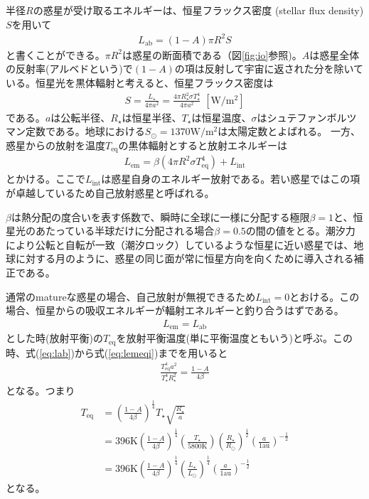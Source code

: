 半径$R$の惑星が受け取るエネルギーは、恒星フラックス密度  (stellar flux density) $S$を用いて
\begin{align}
\label{eq:lab}
L_{\mathrm{ab}}=(1-A) \pi R^2 S  
\end{align}
と書くことができる。$\pi R^2$は惑星の断面積である（図\ref{fig:io}参照)。$A$は惑星全体の反射率(アルベドという)で$(1-A)$の項は反射して宇宙に返された分を除いている。恒星光を黒体輻射と考えると、恒星フラックス密度は
\begin{align}
  \label{eq:starfluxdens}
S= \frac{L_\star}{4 \pi a^2} = \frac{4 \pi R_\star^2 \sigma T_\star^4}{4 \pi a^2}\,\,\mathrm{[W/m^2]} 
\end{align}
である。$a$は公転半径、$R_\star$は恒星半径、$T_\star$は恒星温度、$\sigma$はシュテファンボルツマン定数である。地球における$S_\odot =1370 \mathrm{W/m^2}$は太陽定数とよばれる。
一方、惑星からの放射を温度$T_{\mathrm{eq}}$の黒体輻射とすると放射エネルギーは
\begin{align}
\label{eq:lem}
L_{\mathrm{em}} = \beta ( 4 \pi R^2 \sigma T_{\mathrm{eq}}^4 ) + L_\mathrm{int}
\end{align}
とかける。ここで$ L_\mathrm{int}$は惑星自身のエネルギー放射である。若い惑星ではこの項が卓越しているため自己放射惑星と呼ばれる。

$\beta$は熱分配の度合いを表す係数で、瞬時に全球に一様に分配する極限$\beta=1$と、恒星光のあたっている半球だけに分配される場合$\beta=0.5$の間の値をとる。潮汐力により公転と自転が一致（潮汐ロック）しているような恒星に近い惑星では、地球に対する月のように、惑星の同じ面が常に恒星方向を向くために導入される補正である。


通常のmatureな惑星の場合、自己放射が無視できるため$L_\mathrm{int}=0$とおける。この場合、恒星からの吸収エネルギーが輻射エネルギーと釣り合うはずである。
\begin{align}
\label{eq:lemeqi}
  L_{\mathrm{em}} = L_{\mathrm{ab}}
\end{align}
とした時(放射平衡)の$T_{\mathrm{eq}}$を放射平衡温度(単に平衡温度ともいう)と呼ぶ。この時、式(\ref{eq:lab})から式(\ref{eq:lemeqi})までを用いると
\begin{align}
  \label{eq:eqteq}
 \frac{T_{\mathrm{eq}}^4 a^2 }{T_\star^4 R_\star^2} = \frac{1-A}{4 \beta}
\end{align}
となる。つまり
\begin{align}
 T_\mathrm{eq} &= \left(\frac{1-A}{4 \beta}\right)^{\frac{1}{4}} T_\star \sqrt{\frac{R_\star}{a}} \\
&= 396 \mathrm{K}  \left(\frac{1-A}{4 \beta}\right)^{\frac{1}{4}} \left( \frac{T_\star}{5800 \mathrm{K}}\right) \left( \frac{R_\star}{R_\odot}\right)^{\frac{1}{2}} \left( \frac{a}{1 \mathrm{au}}\right)^{-\frac{1}{2}} \\
&= 396 \mathrm{K}  \left(\frac{1-A}{4 \beta}\right)^{\frac{1}{4}} \left( \frac{L_\star}{L_\odot}\right)^{\frac{1}{4}} \left( \frac{a}{1 \mathrm{au}}\right)^{-\frac{1}{2}}
\end{align}
となる。

